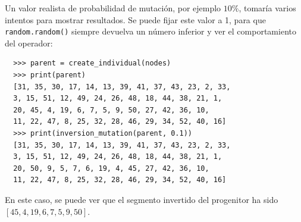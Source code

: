 Un valor realista de probabilidad de mutación, por ejemplo $10\%$, tomaría varios intentos para mostrar resultados. Se
puede fijar este valor a 1, para que \texttt{random.random()} siempre devuelva un número inferior y ver el comportamiento
del operador:

\begin{verbatim}
  >>> parent = create_individual(nodes)          
  >>> print(parent)
  [31, 35, 30, 17, 14, 13, 39, 41, 37, 43, 23, 2, 33, 
  3, 15, 51, 12, 49, 24, 26, 48, 18, 44, 38, 21, 1, 
  20, 45, 4, 19, 6, 7, 5, 9, 50, 27, 42, 36, 10, 
  11, 22, 47, 8, 25, 32, 28, 46, 29, 34, 52, 40, 16]
  >>> print(inversion_mutation(parent, 0.1))
  [31, 35, 30, 17, 14, 13, 39, 41, 37, 43, 23, 2, 33, 
  3, 15, 51, 12, 49, 24, 26, 48, 18, 44, 38, 21, 1, 
  20, 50, 9, 5, 7, 6, 19, 4, 45, 27, 42, 36, 10, 
  11, 22, 47, 8, 25, 32, 28, 46, 29, 34, 52, 40, 16]
\end{verbatim}

En este caso, se puede ver que el segmento invertido del progenitor ha sido $[45, 4, 19, 6, 7, 5, 9, 50]$.

